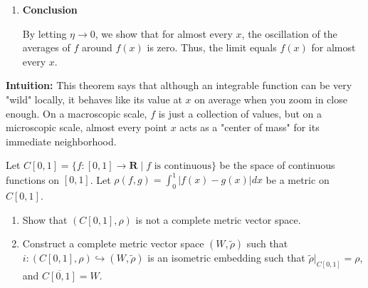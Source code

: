 \begin{solution}
\begin{enumerate}
    \item \textbf{Conclusion}

    By letting $\eta \to 0$, we show that for almost every $x$, the oscillation of the averages of $f$ around $f(x)$ is zero. Thus, the limit equals $f(x)$ for almost every $x$.
\end{enumerate}

\par\vspace{\baselineskip}
\textbf{Intuition:} 
This theorem says that although an integrable function can be very "wild" locally, it behaves like its value at $x$ on average when you zoom in close enough. On a macroscopic scale, $f$ is just a collection of values, but on a microscopic scale, almost every point $x$ acts as a "center of mass" for its immediate neighborhood.
\end{solution}

\begin{exercise}
\label{analysis:2018:10}
Let $C[0, 1] = \{f: [0, 1] \to \mathbf{R} \mid f \text{ is continuous}\}$ be the space of continuous functions on $[0, 1]$. Let $\rho(f, g) = \int_0^1 |f(x) - g(x)| dx$ be a metric on $C[0, 1]$.
\begin{enumerate}
    \item Show that $(C[0, 1], \rho)$ is not a complete metric vector space.
    \item Construct a complete metric vector space $(W, \tilde{\rho})$ such that $i: (C[0, 1], \rho) \hookrightarrow (W, \tilde{\rho})$ is an isometric embedding such that $\tilde{\rho}|_{C[0, 1]} = \rho$, and $\overline{C[0, 1]} = W$.
\end{enumerate}
\end{exercise}

